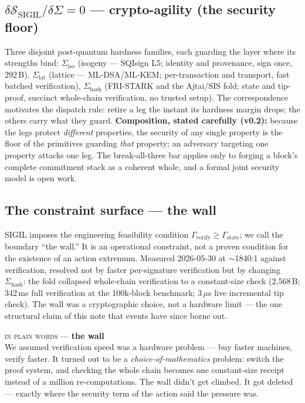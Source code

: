 \documentclass[10pt,a4paper]{article}
\newcommand{\layman}[3]{%
\begin{tcolorbox}[enhanced,
  interior style={left color=#1!9,right color=white},
  colframe=#1!45!slate,boxrule=0.5pt,arc=3pt,
  borderline west={2.5pt}{0pt}{#1},
  left=9pt,right=9pt,top=7pt,bottom=7pt]
{\scriptsize\textcolor{#1}{\textsc{in plain words}}\; — \;\textbf{\small #2}}\\[3pt]
\small #3
\end{tcolorbox}}
\newcommand{\SSIGIL}{\mathcal{S}_{\mathrm{SIGIL}}}
\begin{document}
\subsection{$\delta\SSIGIL/\delta\Sigma = 0$ — crypto-agility (the security floor)}

Three disjoint post-quantum hardness families, each guarding the layer where its
strengths bind: $\Sigma_{\mathrm{iso}}$ (isogeny — SQIsign L5; identity and provenance,
sign once, 292\,B), $\Sigma_{\mathrm{lat}}$ (lattice — ML-DSA/ML-KEM; per-transaction
and transport, fast batched verification), $\Sigma_{\mathrm{hash}}$ (FRI-STARK and the
Ajtai/SIS fold; state and tip-proof, succinct whole-chain verification, no trusted
setup). The correspondence motivates the dispatch rule: retire a leg the instant its
hardness margin drops; the others carry what they guard. \textbf{Composition, stated carefully
(v0.2):} because the legs protect \emph{different} properties, the security of any single
property is the floor of the primitives guarding \emph{that} property; an adversary
targeting one property attacks one leg. The break-all-three bar applies only to forging a
block's complete commitment stack as a coherent whole, and a formal joint security model
is open work.

\subsection{The constraint surface — the wall}

SIGIL imposes the engineering feasibility condition $\Gamma_{\mathrm{verify}} \ge
\Gamma_{\mathrm{state}}$; we call the boundary ``the wall.'' It is an operational
constraint, not a proven condition for the existence of an action extremum. Measured
2026-05-30 at $\sim$1840:1 against verification, resolved not by faster per-signature
verification but by changing
$\Sigma_{\mathrm{hash}}$: the fold collapsed whole-chain verification to a constant-size
check (2{,}568\,B; 342\,ms full verification at the 100k-block benchmark; 3\,$\mu$s
live incremental tip check). The wall was a cryptographic choice, not a hardware limit —
the one structural claim of this note that events have since borne out.

\layman{sigilcyan}{the wall}{We assumed verification speed was a hardware problem —
buy faster machines, verify faster. It turned out to be a \emph{choice-of-mathematics}
problem: switch the proof system, and checking the whole chain becomes one
constant-size receipt instead of a million re-computations. The wall didn't get
climbed. It got deleted — exactly where the security term of the action said the
pressure was.}
\end{document}

